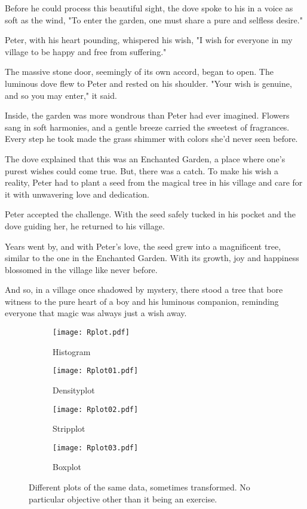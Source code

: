 \documentclass[10pt, a4paper, titlepage]{article}
\begin{document}
Before he could process this beautiful sight, the dove spoke to his in a voice as soft as the wind, "To enter the garden, one must share a pure and selfless desire."

Peter, with his heart pounding, whispered his wish, "I wish for everyone in my village to be happy and free from suffering."

The massive stone door, seemingly of its own accord, began to open. The luminous dove flew to Peter and rested on his shoulder. "Your wish is genuine, and so you may enter," it said.

Inside, the garden was more wondrous than Peter had ever imagined. Flowers sang in soft harmonies, and a gentle breeze carried the sweetest of fragrances. Every step he took made the grass shimmer with colors she'd never seen before.

The dove explained that this was an Enchanted Garden, a place where one’s purest wishes could come true. But, there was a catch. To make his wish a reality, Peter had to plant a seed from the magical tree in his village and care for it with unwavering love and dedication.

Peter accepted the challenge. With the seed safely tucked in his pocket and the dove guiding her, he returned to his village.

Years went by, and with Peter's love, the seed grew into a magnificent tree, similar to the one in the Enchanted Garden. With its growth, joy and happiness blossomed in the village like never before.

And so, in a village once shadowed by mystery, there stood a tree that bore witness to the pure heart of a boy and his luminous companion, reminding everyone that magic was always just a wish away.

\newpage
\begin{figure}
	\centering
	\begin{subfigure}{.49\textwidth}
		\texttt{[image: Rplot.pdf]}
		\caption{Histogram}
	\end{subfigure}
	\begin{subfigure}{.49\textwidth}
		\texttt{[image: Rplot01.pdf]}
		\caption{Densityplot}
	\end{subfigure}
	\begin{subfigure}{.49\textwidth}
		\texttt{[image: Rplot02.pdf]}
		\caption{Stripplot}
	\end{subfigure}
	\begin{subfigure}{.49\textwidth}
		\texttt{[image: Rplot03.pdf]}
		\caption{Boxplot}
	\end{subfigure}
	\caption{Different plots of the same data, sometimes transformed. No particular objective other than it being an exercise.}
\end{figure}
\end{document}
